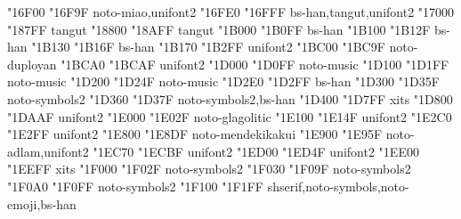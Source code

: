 \documentclass{article}
\begin{document}
                                           { "16F00} { "16F9F} {noto-miao,unifont2}
            { "16FE0} { "16FFF} {bs-han,tangut,unifont2}
                                         { "17000} { "187FF} {tangut}
                              { "18800} { "18AFF} {tangut}
                                { "1B000} { "1B0FF} {bs-han}
                                { "1B100} { "1B12F} {bs-han}
                           { "1B130} { "1B16F} {bs-han}
                                          { "1B170} { "1B2FF} {unifont2}
                                       { "1BC00} { "1BC9F} {noto-duployan}
                      { "1BCA0} { "1BCAF} {unifont2}
                      { "1D000} { "1D0FF} {noto-music}
                                { "1D100} { "1D1FF} {noto-music}
                 { "1D200} { "1D24F} {noto-music}
                                 { "1D2E0} { "1D2FF} {bs-han}
                          { "1D300} { "1D35F} {noto-symbols2}
                          { "1D360} { "1D37F} {noto-symbols2,bs-han}
              { "1D400} { "1D7FF} {xits}
                             { "1D800} { "1DAAF} {unifont2}
                          { "1E000} { "1E02F} {noto-glagolitic}
                         { "1E100} { "1E14F} {unifont2}
                                         { "1E2C0} { "1E2FF} {unifont2}
                                  { "1E800} { "1E8DF} {noto-mendekikakui}
                                          { "1E900} { "1E95F} {noto-adlam,unifont2}
                            { "1EC70} { "1ECBF} {unifont2}
                          { "1ED00} { "1ED4F} {unifont2}
         { "1EE00} { "1EEFF} {xits}
                                  { "1F000} { "1F02F} {noto-symbols2}
                                   { "1F030} { "1F09F} {noto-symbols2}
                                  { "1F0A0} { "1F0FF} {noto-symbols2}
               { "1F100} { "1F1FF} {shserif,noto-symbols,noto-emoji,bs-han}
\end{document}
